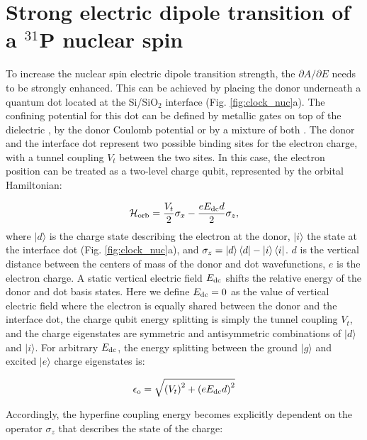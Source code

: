\documentclass[
 aps,prb,twocolumn,
 amsmath,amssymb,superscriptaddress,
] {revtex4-1}
\begin{document}
\section{Strong electric dipole transition of a $^{31}$P nuclear spin} \label{sec:strong}

To increase the nuclear spin electric dipole transition strength, the $\partial A/\partial E$ needs to be strongly enhanced. This can be achieved by placing the donor underneath a quantum dot located at the Si/SiO$_2$ interface \cite{Tosi2017} (Fig. \ref{fig:clock_nuc}a). The confining potential for this dot can be defined by metallic gates on top of the dielectric \cite{Veldhorst2014}, by the donor Coulomb potential \cite{Calderon2006} or by a mixture of both \cite{Tosi2017,Harvey-Collard2017}. The donor and the interface dot represent two possible binding sites for the electron charge, with a tunnel coupling $V_t$ between the two sites. In this case, the electron position can be treated as a two-level charge qubit, represented by the orbital Hamiltonian:

\begin{equation} \label{eq:H_orb}
\mathcal{H}_{\rm orb}=\frac{V_t}{2}\sigma_x - \frac{eE_{\rm dc}d}{2}\sigma_z,
\end{equation}
where $|d\rangle$ is the charge state describing the electron at the donor, $|i\rangle$ the state at the interface dot (Fig. \ref{fig:clock_nuc}a), and $\sigma_z = \ket{d}\bra{d} - \ket{i}\bra{i}$. $d$ is the vertical distance between the centers of mass of the donor and dot wavefunctions, $e$ is the electron charge. A static vertical electric field $E_{\rm dc}$ shifts the relative energy of the donor and dot basis states. Here we define $E_{\rm dc}=0$ as the value of vertical electric field where the electron is equally shared between the donor and the interface dot, the charge qubit energy splitting is simply the tunnel coupling $V_t$, and the charge eigenstates are symmetric and antisymmetric combinations of $|d\rangle$ and $|i\rangle$. For arbitrary $E_{\rm dc}$, the energy splitting between the ground $\lvert g\rangle$ and excited $\lvert e\rangle$ charge eigenstates is:

\begin{equation} \label{eq:e_o}
\epsilon_{\rm o}=\sqrt{\left(V_t\right)^2+\left(eE_{\rm dc}d\right)^2}
\end{equation}

Accordingly, the hyperfine coupling energy becomes explicitly dependent on the operator $\sigma_z$ that describes the state of the charge:
\end{document}

